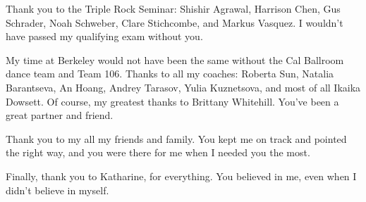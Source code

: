 \documentclass{ucbthesis}
\begin{document}
\begin{frontmatter}
\begin{acknowledgements}
Thank you to the Triple Rock Seminar: Shishir Agrawal, Harrison Chen, Gus
Schrader, Noah Schweber, Clare Stichcombe, and Markus Vasquez. I wouldn't have
passed my qualifying exam without you.

My time at Berkeley would not have been the same without the Cal Ballroom dance
team and Team 106. Thanks to all my coaches: Roberta Sun, Natalia Barantseva,
An Hoang, Andrey Tarasov, Yulia Kuznetsova, and most of all Ikaika Dowsett. Of
course, my greatest thanks to Brittany Whitehill. You've been a great  partner
and friend.

Thank you to my all my friends and family. You kept me on track and pointed the
right way, and you were there for me when I needed you the most.

Finally, thank you to Katharine, for everything. You believed in me, even when
I didn't believe in myself.

\end{acknowledgements}

\end{frontmatter}

\pagestyle{headings}









\end{document}
